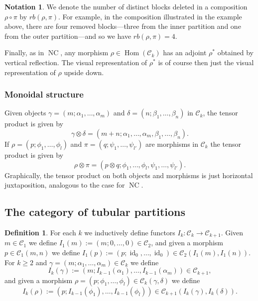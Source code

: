 \documentclass[12pt, a4paper]{amsart}
\def\id{\operatorname{id}}
\def\NC{\operatorname{NC}}
\def\Hom{\operatorname{Hom}}
\def\CC{\mathcal{C}}
\theoremstyle{definition}
\newtheorem{definition}[thm]{Definition}
\newtheorem{notation}[thm]{Notation}
\theoremstyle{remark}
\numberwithin{equation}{section}
\begin{document}
\begin{notation}\label{note: deletedblocks}
	We denote the number of distinct blocks deleted in a composition $\rho\circ\pi$ by $rb(\rho,\pi)$. For example, in the composition illustrated in the example above, there are four removed blocks---three from the inner partition and one from the outer partition---and so we have $rb(\rho,\pi) = 4$. 
\end{notation}

Finally, as in $\NC$, any morphism $\rho\in\Hom(\CC_k)$ has an adjoint $\rho^*$ obtained by vertical reflection. The visual representation of $\rho^*$ is of course then just the visual representation of $\rho$ upside down.

\subsubsection{Monoidal structure}

Given objects $\gamma = (m;\alpha_1,\dots,\alpha_m)$ and $\delta=(n;\beta_1,\dots,\beta_n)$ in $\CC_k$, the tensor product is given by
\[
\gamma \otimes \delta = (m+n;\alpha_1,\dots,\alpha_m,\beta_1,\dots,\beta_n).
\]
If $\rho = (p;\phi_1,\dots,\phi_l)$ and $\pi = (q;\psi_1,\dots,\psi_{l'})$ are morphisms in $\CC_k$ the tensor product is given by
\[
 \rho\otimes\pi = (p\otimes q;\phi_1,\dots,\phi_l,\psi_1,\dots,\psi_{l'}).
\]
Graphically, the tensor product on both objects and morphisms is just horizontal juxtaposition, analogous to the case for $\NC$.

\subsection{The category of tubular partitions}

\begin{definition}\label{def: functorsIk}
	For each $k$ we inductively define functors $I_k : \CC_k \to \CC_{k+1}$. Given $m\in\CC_1$ we define $I_1(m) := (m;0,\dots,0)\in\CC_2$, and given a morphism $p\in\CC_1(m,n)$ we define $I_1(p) := (p;\id_0,\dots,\id_0) \in \CC_2(I_1(m),I_1(n))$. For $k\geq 2$ and $\gamma = (m;\alpha_1,\dots,\alpha_m) \in \CC_k$ we define
\[
 I_k(\gamma) := (m;I_{k-1}(\alpha_1),\dots,I_{k-1}(\alpha_m)) \in \CC_{k+1},
\]
and given a morphism $\rho = (p;\phi_1,\dots,\phi_l) \in \CC_k(\gamma,\delta)$ we define
\[
 I_k(\rho) := (p;I_{k-1}(\phi_1),\dots,I_{k-1}(\phi_l)) \in \CC_{k+1}(I_k(\gamma),I_k(\delta)).
\]
\end{definition}
\end{document}
